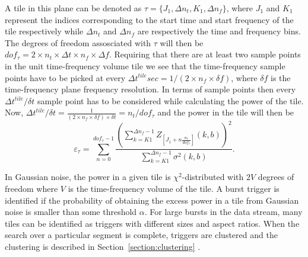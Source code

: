A tile in this plane can be denoted as $\tau =\{J_1, \Delta n_t, K_1, \Delta 
n_f\}$,  where $J_1$ and $K_1$ represent the indices corresponding to the 
start time and start frequency of the tile respectively while $\Delta n_t$ 
and $\Delta n_f$ are respectively the time and frequency bins.  The degrees 
of freedom assosciated with $\tau$ will then be $dof_{\tau} = 2 \times n_t 
\times \Delta t \times n_f \times \Delta f $.  Requiring that there are at 
least two sample points in the unit time-frequency volume tile we see that 
the time-frequency sample points have to be picked at every  $\Delta t^{tile} 
sec = 1 / (2 \times n_f \times \delta f)$,  where $\delta f$ is the 
time-frequency plane frequency resolution.  In terms of sample points then 
every $\Delta t^{tile} / \delta t $ sample point has to be considered while 
calculating the power of the tile.  Now,  $\Delta t^{tile} / \delta t = 
\frac{1}{(2 \times n_f \times \delta f) \times \delta t} = n_t / dof_{\tau}$  
and the power in the tile will then be 
\begin{equation}
\varepsilon_{\tau} = \sum_{n=0}^{dof_{\tau}-1}\frac{(\sum_{k=K1}^{\Delta 
n_f -1}Z_{[J_1 + n\frac{n_t}{dof_{\tau}}]}(k,b))^2}{\sum_{k=K1}^{\Delta 
n_f -1}\sigma^2(k,b)}.
\end{equation}

In Gaussian noise,  the power in a given tile is $\chi^2$-distributed
with $2 V$ degrees of freedom where $V$ is the time-frequency volume
of the tile.    A burst trigger is identified if the probability of
obtaining the excess power in a tile from Gaussian noise is smaller
than some threshold $\alpha$.   For large bursts in the data stream,
many tiles can be identified as triggers with different sizes and
aspect ratios.   When the search over a particular segment is
complete,   triggers are clustered and the clustering is described in 
Section~\ref{section:clustering} .
\clearpage

